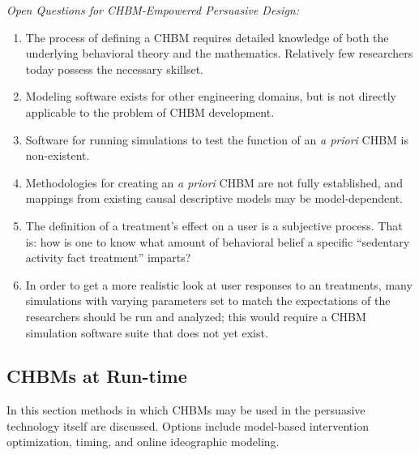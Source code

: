 \documentclass[runningheads,a4paper]{llncs}
\begin{document}
\emph{Open Questions for CHBM-Empowered Persuasive Design:}
\begin{enumerate}
    \item The process of defining a CHBM requires detailed knowledge of both the underlying behavioral theory and the mathematics. Relatively few researchers today possess the necessary skillset.
    \item Modeling software exists for other engineering domains, but is not directly applicable to the problem of CHBM development. %
    \item Software for running simulations to test the function of an \emph{a priori} CHBM is non-existent.
    \item Methodologies for creating an \emph{a priori} CHBM are not fully established, and mappings from existing causal descriptive models may be model-dependent.
    \item The definition of a treatment's effect on a user is a subjective process. That is: how is one to know what amount of behavioral belief a specific ``sedentary activity fact treatment'' imparts?
  \item %
In order to get a more realistic look at user responses to an treatments, many simulations with varying parameters set to match the expectations of the researchers should be run and analyzed; this would require a CHBM simulation software suite that does not yet exist.
\end{enumerate}


\subsection{CHBMs at Run-time}
In this section methods in which CHBMs may be used in the persuasive technology itself are discussed. 
Options include model-based intervention optimization, timing, and online ideographic modeling.
\end{document}
